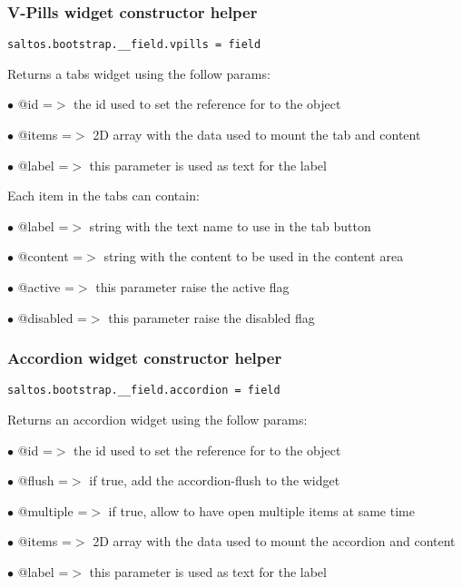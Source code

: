 \documentclass[a4paper]{article}
\begin{document}
\hypertarget{toc647}{}
\subsubsection{V-Pills widget constructor helper}

\begin{lstlisting}
saltos.bootstrap.__field.vpills = field
\end{lstlisting}

Returns a tabs widget using the follow params:

\begin{compactitem}
\item[\color{myblue}$\bullet$] @id    =$>$ the id used to set the reference for to the object
\item[\color{myblue}$\bullet$] @items =$>$ 2D array with the data used to mount the tab and content
\item[\color{myblue}$\bullet$] @label    =$>$ this parameter is used as text for the label
\end{compactitem}

Each item in the tabs can contain:

\begin{compactitem}
\item[\color{myblue}$\bullet$] @label    =$>$ string with the text name to use in the tab button
\item[\color{myblue}$\bullet$] @content  =$>$ string with the content to be used in the content area
\item[\color{myblue}$\bullet$] @active   =$>$ this parameter raise the active flag
\item[\color{myblue}$\bullet$] @disabled =$>$ this parameter raise the disabled flag
\end{compactitem}

\hypertarget{toc648}{}
\subsubsection{Accordion widget constructor helper}

\begin{lstlisting}
saltos.bootstrap.__field.accordion = field
\end{lstlisting}

Returns an accordion widget using the follow params:

\begin{compactitem}
\item[\color{myblue}$\bullet$] @id       =$>$ the id used to set the reference for to the object
\item[\color{myblue}$\bullet$] @flush    =$>$ if true, add the accordion-flush to the widget
\item[\color{myblue}$\bullet$] @multiple =$>$ if true, allow to have open multiple items at same time
\item[\color{myblue}$\bullet$] @items    =$>$ 2D array with the data used to mount the accordion and content
\item[\color{myblue}$\bullet$] @label    =$>$ this parameter is used as text for the label
\end{compactitem}
\end{document}
